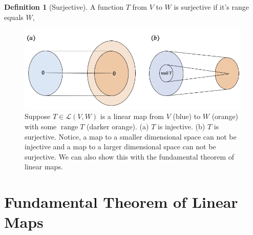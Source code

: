 \documentclass[12pt]{report}
\numberwithin{equation}{section}
\theoremstyle{definition}
\newtheorem{definition}[theorem]{Definition}
\DeclareMathOperator{\range}{range}
\begin{document}
\begin{definition}[Surjective]
	A function $ T $ from $ V $ to $ W $ is surjective if it's range equals $ W $, 
\end{definition}

\begin{figure}[H]
	\centering
	\includegraphics[width=12cm] {img/injsur}
	\caption{Suppose $ T\in\mathcal{L}(V,W) $ is a linear map from $ V $ (blue) to $ W $ (orange) with some $ \range T$ (darker orange). (a) $ T $ is injective. (b) $ T $ is surjective. Notice, a map to a smaller dimensional space can not be injective and a map to a larger dimensional space can not be surjective. We can also show this with the fundamental theorem of linear maps.}
\end{figure}

\section{Fundamental Theorem of Linear Maps}
\end{document}

